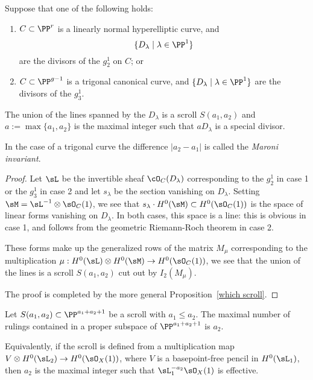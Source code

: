 \begin{corollary}\label{hyperelliptic and trigonal} Suppose that one of the following holds:
\begin{enumerate}
 \item  $C\subset \PP^r$ is a linearly normal hyperelliptic curve, and  
$$
\{D_\lambda \mid \lambda \in \PP^1\}
$$
are the divisors of the $g^1_2$ on $C$; or


\item $C\subset \PP^{g-1}$ is a trigonal canonical curve, and  
$\{D_\lambda \mid \lambda \in \PP^1\}$
are the divisors of the $g^1_3$.
\end{enumerate}

The union of the lines spanned by the $D_\lambda$
is a scroll $S(a_1,a_2)$ and $a:= \max\{a_1, a_2\}$ is the maximal integer such that
$aD_\lambda$ is a special divisor.
\end{corollary}

\begin{remark}
 In the case of a trigonal curve the difference $|a_2-a_1|$ is called the \emph{Maroni invariant}.
\end{remark}
\begin{proof}
Let $\sL$ be the invertible sheaf $\cO_C(D_\lambda)$ corresponding to the $g^1_2$ in case 1 or
the $g_3^1$ in case 2 and let $s_\lambda$ be
the section vanishing on $D_\lambda$. Setting $\sM =  \sL^{-1}\otimes \sO_C(1)$, we see that
$s_\lambda\cdot H^0(\sM) \subset H^0(\sO_C(1))$ is the space of linear forms vanishing on
$D_\lambda$. In both cases, this space is a line: this is obvious in case 1, and follows from the 
geometric Riemann-Roch theorem in case 2. 

These forms make up the
generalized rows of the matrix $M_\mu$ corresponding to the multiplication
$\mu: H^0(\sL)\otimes H^0(\sM) \to H^0(\sO_C(	1))$, we see that the union of the lines is a
scroll $S(a_1,a_2)$ cut out by $I_2(M_\mu)$.

The proof is completed by the more general Proposition~\ref{which scroll}.
\end{proof}

\begin{proposition}\label{which scroll}
Let $S(a_1,a_2)\subset \PP^{a_1+a_2+1}$ be a scroll with $a_1\leq a_2$. The maximal number of rulings contained in
a proper subspace of $ \PP^{a_1+a_2+1}$ is $a_2$. 

Equivalently, if the scroll is defined from a multiplication
map $V\otimes H^0(\sL_2) \to H^0(\sO_X(1))$, where $V$ is a basepoint-free pencil in $H^0(\sL_1)$,
then $a_2$ is the maximal integer such that $\sL_1^{-a_2}\sO_X(1)$ is effective.
\end{proposition}

